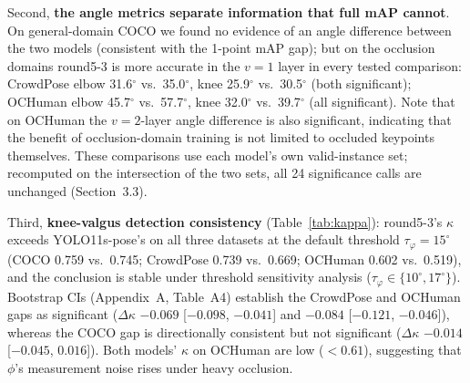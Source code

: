 \documentclass[10pt,conference]{IEEEtran}
\begin{document}
Second, \textbf{the angle metrics separate information that full mAP cannot}. On general-domain COCO we found no evidence of an angle difference between the two models (consistent with the 1-point mAP gap); but on the occlusion domains round5-3 is more accurate in the $v{=}1$ layer in every tested comparison: CrowdPose elbow 31.6$^{\circ}$ vs.\ 35.0$^{\circ}$, knee 25.9$^{\circ}$ vs.\ 30.5$^{\circ}$ (both significant); OCHuman elbow 45.7$^{\circ}$ vs.\ 57.7$^{\circ}$, knee 32.0$^{\circ}$ vs.\ 39.7$^{\circ}$ (all significant). Note that on OCHuman the $v{=}2$-layer angle difference is also significant, indicating that the benefit of occlusion-domain training is not limited to occluded keypoints themselves. These comparisons use each model's own valid-instance set; recomputed on the intersection of the two sets, all 24 significance calls are unchanged (Section~3.3).

Third, \textbf{knee-valgus detection consistency} (Table~\ref{tab:kappa}): round5-3's $\kappa$ exceeds YOLO11s-pose's on all three datasets at the default threshold $\tau_\varphi{=}15^{\circ}$ (COCO 0.759 vs.\ 0.745; CrowdPose 0.739 vs.\ 0.669; OCHuman 0.602 vs.\ 0.519), and the conclusion is stable under threshold sensitivity analysis ($\tau_\varphi\in\{10^{\circ},17^{\circ}\}$). Bootstrap CIs (Appendix~A, Table~A4) establish the CrowdPose and OCHuman gaps as significant ($\Delta\kappa$ $-0.069$ [$-0.098$, $-0.041$] and $-0.084$ [$-0.121$, $-0.046$]), whereas the COCO gap is directionally consistent but not significant ($\Delta\kappa$ $-0.014$ [$-0.045$, $0.016$]). Both models' $\kappa$ on OCHuman are low ($<0.61$), suggesting that $\phi$'s measurement noise rises under heavy occlusion.

\begin{table}[t]
\centering
\caption{Knee-valgus detection consistency (binarized $\phi$ vs.\ GT). Bold $=$ higher value (round5-3); bootstrap CIs for $\kappa$ and for the model difference are in Appendix~A.}
\label{tab:kappa}
\renewcommand{\arraystretch}{1.15}
\end{table}
\end{document}
